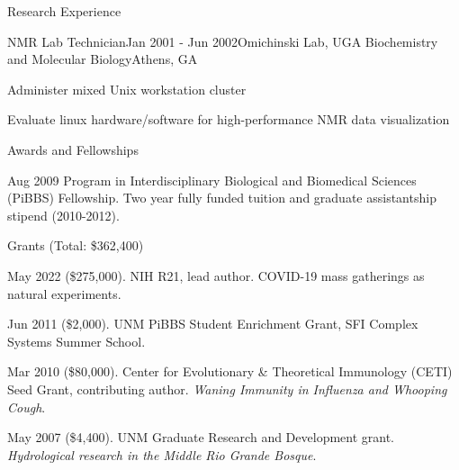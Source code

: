 \documentclass{resume} %
\begin{document}
\begin{rSection}{Research Experience}
\begin{rSubsection}{NMR Lab Technician}{Jan 2001 - Jun 2002}{Omichinski Lab, UGA
Biochemistry and Molecular Biology}{Athens, GA}
\item Administer mixed Unix workstation cluster
\item Evaluate linux hardware/software for high-performance NMR data visualization
\end{rSubsection}
\end{rSection}


\begin{rSection}{Awards and Fellowships}
\item Aug 2009 Program in Interdisciplinary Biological and Biomedical Sciences
(PiBBS) Fellowship. Two year fully funded tuition and graduate assistantship
stipend (2010-2012).
\end{rSection}

\begin{rSection}{Grants (Total: \$362,400)}
\item May 2022 (\$275,000). NIH R21, lead author. COVID-19 mass gatherings as natural experiments.
\item Jun 2011 (\$2,000). UNM PiBBS Student Enrichment Grant, SFI Complex Systems Summer School.
\item Mar 2010 (\$80,000). Center for Evolutionary \& Theoretical Immunology (CETI) Seed
Grant, contributing author. {\em Waning Immunity in Influenza and Whooping Cough}.
\item May 2007 (\$4,400). UNM Graduate Research and Development grant. {\em Hydrological research in the Middle Rio Grande Bosque}. 
\end{rSection}
\end{document}
